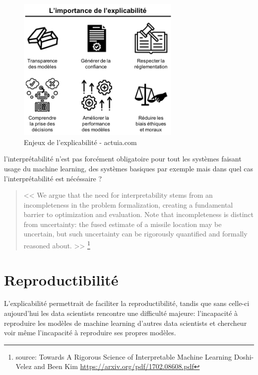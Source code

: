             \begin{figure}[H]
                \centering
                \includegraphics[width=0.7\textwidth]{Images/explicabilite}
                \caption{Enjeux de l'explicabilité - actuia.com}
                \label{fig:explicability}
            \end{figure}

            l'interprétabilité n'est pas forcément obligatoire pour tout les systèmes 
            faisant usage du machine learning, des systèmes basiques par exemple 
            mais dans quel cas l'interprétabilité est nécéssaire ?  \newline
    
            \begin{quote}
                << We argue that the need for interpretability
                stems from an incompleteness in the problem formalization, creating a fundamental barrier to
                optimization and evaluation. Note that incompleteness is distinct from uncertainty: the fused
                estimate of a missile location may be uncertain, but such uncertainty can be rigorously quantified
                and formally reasoned about. >>
                \footnote{source: Towards A Rigorous Science of Interpretable Machine Learning \newline
                Doshi-Velez and Been Kim \newline
                \url{https://arxiv.org/pdf/1702.08608.pdf}}
                \newline
            \end{quote}

        \newpage
        \section{Reproductibilité}
        L'explicabilité permettrait de faciliter la reproductibilité, tandis que sans celle-ci 
        aujourd'hui les data scientists rencontre une difficulté majeure: 
        l'incapacité à reproduire les modèles de machine learning d'autres data scientists 
        et chercheur voir même l'incapacité à reproduire ses propres modèles. \newline 
        
